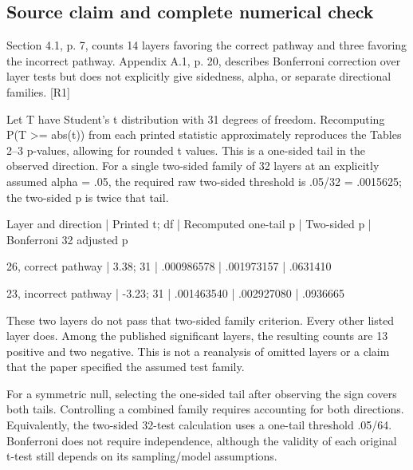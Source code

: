 \documentclass[10pt]{article}
\begin{document}
\subsection*{Source claim and complete numerical check}
Section 4.1, p. 7, counts 14 layers favoring the correct pathway and three favoring the incorrect pathway. Appendix A.1, p. 20, describes Bonferroni correction over layer tests but does not explicitly give sidedness, alpha, or separate directional families. [R1]\par
Let T have Student’s t distribution with 31 degrees of freedom. Recomputing P(T >= abs(t)) from each printed statistic approximately reproduces the Tables 2–3 p-values, allowing for rounded t values. This is a one-sided tail in the observed direction. For a single two-sided family of 32 layers at an explicitly assumed alpha = .05, the required raw two-sided threshold is .05/32 = .0015625; the two-sided p is twice that tail.\par
Layer and direction | Printed t; df | Recomputed one-tail p | Two-sided p | Bonferroni 32 adjusted p\par
26, correct pathway | 3.38; 31 | .000986578 | .001973157 | .0631410\par
23, incorrect pathway | -3.23; 31 | .001463540 | .002927080 | .0936665\par
These two layers do not pass that two-sided family criterion. Every other listed layer does. Among the published significant layers, the resulting counts are 13 positive and two negative. This is not a reanalysis of omitted layers or a claim that the paper specified the assumed test family.\par
For a symmetric null, selecting the one-sided tail after observing the sign covers both tails. Controlling a combined family requires accounting for both directions. Equivalently, the two-sided 32-test calculation uses a one-tail threshold .05/64. Bonferroni does not require independence, although the validity of each original t-test still depends on its sampling/model assumptions.\par
\end{document}
